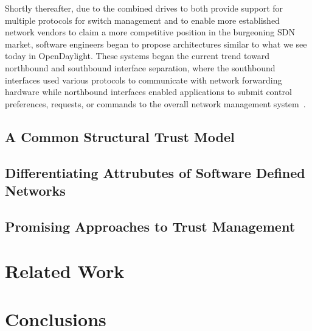 \documentclass[10pt,letterpaper,twocolumn]{article}
\begin{document}
Shortly thereafter, due to the combined drives to both provide support for multiple protocols for switch management and to enable more established network vendors to claim a more competitive position in the burgeoning SDN market, software engineers began to propose architectures similar to what we see today in OpenDaylight.  These systems began the current trend toward northbound and southbound interface separation, where the southbound interfaces used various protocols to communicate with network forwarding hardware while northbound interfaces enabled applications to submit control preferences, requests, or commands to the overall network management system~\cite{opendaylight,BIG_NETWORK_CONTROLLER}.


\subsection{A Common Structural Trust Model}

\subsection{Differentiating Attrubutes of Software Defined Networks}

\subsection{Promising Approaches to Trust Management}

\section{Related Work}

\section{Conclusions}

\printbibliography
\end{document}
